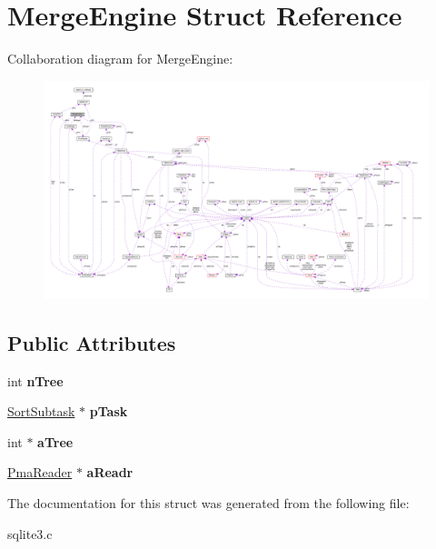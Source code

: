 \hypertarget{structMergeEngine}{}\section{Merge\+Engine Struct Reference}
\label{structMergeEngine}


Collaboration diagram for Merge\+Engine\+:\nopagebreak
\begin{figure}[H]
\begin{center}
\leavevmode
\includegraphics[width=350pt]{structMergeEngine__coll__graph}
\end{center}
\end{figure}
\subsection*{Public Attributes}
\begin{DoxyCompactItemize}
\item 
int {\bfseries n\+Tree}\hypertarget{structMergeEngine_a48d8ad99ae5063e96458b5563ff2bbd3}{}\label{structMergeEngine_a48d8ad99ae5063e96458b5563ff2bbd3}

\item 
\hyperlink{structSortSubtask}{Sort\+Subtask} $\ast$ {\bfseries p\+Task}\hypertarget{structMergeEngine_a0a366796f579aa7befcb2683ff767c0d}{}\label{structMergeEngine_a0a366796f579aa7befcb2683ff767c0d}

\item 
int $\ast$ {\bfseries a\+Tree}\hypertarget{structMergeEngine_aac39bb928db1c72c48db263e0937b285}{}\label{structMergeEngine_aac39bb928db1c72c48db263e0937b285}

\item 
\hyperlink{structPmaReader}{Pma\+Reader} $\ast$ {\bfseries a\+Readr}\hypertarget{structMergeEngine_a897688db3212c8b3049a57cda6f2f975}{}\label{structMergeEngine_a897688db3212c8b3049a57cda6f2f975}

\end{DoxyCompactItemize}


The documentation for this struct was generated from the following file\+:\begin{DoxyCompactItemize}
\item 
sqlite3.\+c\end{DoxyCompactItemize}
